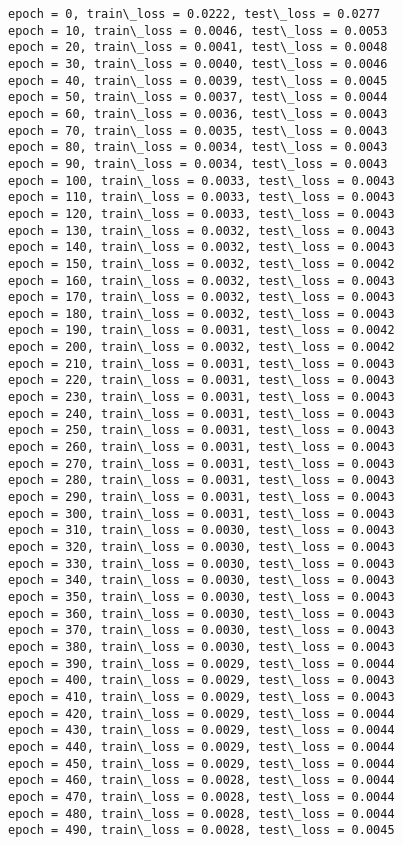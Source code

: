 \documentclass[11pt]{article}
\begin{document}
    \begin{Verbatim}[commandchars=\\\{\}]
epoch = 0, train\_loss = 0.0222, test\_loss = 0.0277
epoch = 10, train\_loss = 0.0046, test\_loss = 0.0053
epoch = 20, train\_loss = 0.0041, test\_loss = 0.0048
epoch = 30, train\_loss = 0.0040, test\_loss = 0.0046
epoch = 40, train\_loss = 0.0039, test\_loss = 0.0045
epoch = 50, train\_loss = 0.0037, test\_loss = 0.0044
epoch = 60, train\_loss = 0.0036, test\_loss = 0.0043
epoch = 70, train\_loss = 0.0035, test\_loss = 0.0043
epoch = 80, train\_loss = 0.0034, test\_loss = 0.0043
epoch = 90, train\_loss = 0.0034, test\_loss = 0.0043
epoch = 100, train\_loss = 0.0033, test\_loss = 0.0043
epoch = 110, train\_loss = 0.0033, test\_loss = 0.0043
epoch = 120, train\_loss = 0.0033, test\_loss = 0.0043
epoch = 130, train\_loss = 0.0032, test\_loss = 0.0043
epoch = 140, train\_loss = 0.0032, test\_loss = 0.0043
epoch = 150, train\_loss = 0.0032, test\_loss = 0.0042
epoch = 160, train\_loss = 0.0032, test\_loss = 0.0043
epoch = 170, train\_loss = 0.0032, test\_loss = 0.0043
epoch = 180, train\_loss = 0.0032, test\_loss = 0.0043
epoch = 190, train\_loss = 0.0031, test\_loss = 0.0042
epoch = 200, train\_loss = 0.0032, test\_loss = 0.0042
epoch = 210, train\_loss = 0.0031, test\_loss = 0.0043
epoch = 220, train\_loss = 0.0031, test\_loss = 0.0043
epoch = 230, train\_loss = 0.0031, test\_loss = 0.0043
epoch = 240, train\_loss = 0.0031, test\_loss = 0.0043
epoch = 250, train\_loss = 0.0031, test\_loss = 0.0043
epoch = 260, train\_loss = 0.0031, test\_loss = 0.0043
epoch = 270, train\_loss = 0.0031, test\_loss = 0.0043
epoch = 280, train\_loss = 0.0031, test\_loss = 0.0043
epoch = 290, train\_loss = 0.0031, test\_loss = 0.0043
epoch = 300, train\_loss = 0.0031, test\_loss = 0.0043
epoch = 310, train\_loss = 0.0030, test\_loss = 0.0043
epoch = 320, train\_loss = 0.0030, test\_loss = 0.0043
epoch = 330, train\_loss = 0.0030, test\_loss = 0.0043
epoch = 340, train\_loss = 0.0030, test\_loss = 0.0043
epoch = 350, train\_loss = 0.0030, test\_loss = 0.0043
epoch = 360, train\_loss = 0.0030, test\_loss = 0.0043
epoch = 370, train\_loss = 0.0030, test\_loss = 0.0043
epoch = 380, train\_loss = 0.0030, test\_loss = 0.0043
epoch = 390, train\_loss = 0.0029, test\_loss = 0.0044
epoch = 400, train\_loss = 0.0029, test\_loss = 0.0043
epoch = 410, train\_loss = 0.0029, test\_loss = 0.0043
epoch = 420, train\_loss = 0.0029, test\_loss = 0.0044
epoch = 430, train\_loss = 0.0029, test\_loss = 0.0044
epoch = 440, train\_loss = 0.0029, test\_loss = 0.0044
epoch = 450, train\_loss = 0.0029, test\_loss = 0.0044
epoch = 460, train\_loss = 0.0028, test\_loss = 0.0044
epoch = 470, train\_loss = 0.0028, test\_loss = 0.0044
epoch = 480, train\_loss = 0.0028, test\_loss = 0.0044
epoch = 490, train\_loss = 0.0028, test\_loss = 0.0045
    \end{Verbatim}
\end{document}
